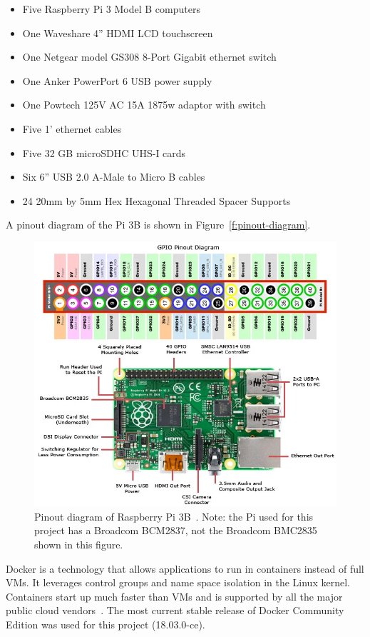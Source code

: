 \begin{itemize}
\item Five Raspberry Pi 3 Model B computers 
\item One Waveshare 4'' HDMI LCD touchscreen
\item One Netgear model GS308 8-Port Gigabit ethernet switch
\item One Anker PowerPort 6 USB power supply
\item One Powtech 125V AC 15A 1875w adaptor with switch
\item Five 1' ethernet cables
\item Five 32 GB microSDHC UHS-I cards
\item Six 6'' USB 2.0 A-Male to Micro B cables
\item 24 20mm by 5mm Hex Hexagonal Threaded Spacer Supports
\end{itemize}

A pinout diagram of the Pi 3B is shown in Figure~\ref{f:pinout-diagram}.

\begin{figure}[!ht]
  \centering\includegraphics[width=\columnwidth]{images/raspberry_pi_circuit_note_fig2.png}
  \caption{Pinout diagram of Raspberry Pi 3B~\cite{hid-sp18-419-pi-pinout}. Note: the Pi used for this project has a Broadcom BCM2837, not the Broadcom BMC2835 shown in this figure.}\label{f:pinout-digram}
\end{figure}

Docker is a technology that allows applications to run in containers
instead of full VMs. It leverages control groups and name space
isolation in the Linux kernel. Containers start up much faster than
VMs and is supported by all the major public cloud
vendors~\cite{Foster:2017:CCS:3158276}. The most current stable
release of Docker Community Edition was used for this project
(18.03.0-ce).


